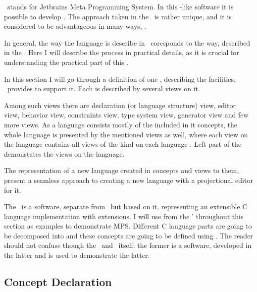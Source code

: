 
\jbmps\ stands for Jetbrains Meta Programming System. In this -like software it is possible to develop .
The approach taken in the \jbmps\ is rather unique, and it is considered to be advantageous in many ways, \cite{Voelter:MoDELS:2010}.


In general, the way the language is describe in \jbmps\ coresponds to the way, described in the .
Here I will describe the process in practical details, as it is crucial for understanding the practical part of this \MT.

In this section I will go through a definition of one , describing the facilities, \jbmps\ provides to support
it. Each  is described by several views on it. 


Among such views there are  declaration (or language structure) view, editor view, behavior view, constraints view, type system view,
generator view and few more views. As a language consists mostly of the included in it concepts, 
the whole language is presented by the mentioned views as well, where each view on the language contains all views of the kind on each language . 
Left part of the  demonstates the views on the  language.

The representation of a new language created in concepts and views to them, present a seamless approach to creating 
a new language with a projectional editor for it.

The \mbp\ is a software, separate from \jbmps\, but based on it, representing an extensible C language implementation with extensions.
I will use  from the \mbp' throughout this section as examples to demonstrate MPS. Different C language parts are going to be 
decomposed into  and these concepts are going to be defined using \jbmps. The reader should not confuse though the \mbp\ and 
\jbmps\ itself: the former is a software, developed in the latter and is used to demonstrate the latter.

\subsection{Concept Declaration}
\label{mpsconceptdeclaration}

